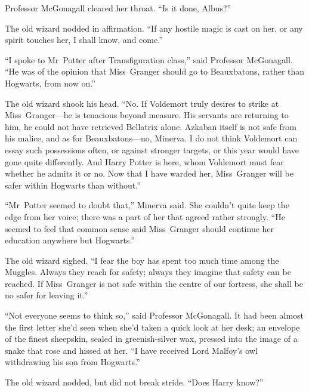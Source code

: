 Professor McGonagall cleared her throat. “Is it done, Albus?”

The old wizard nodded in affirmation. “If any hostile magic is cast on her, or any spirit touches her, I shall know, and come.”

“I spoke to Mr~Potter after Transfiguration class,” said Professor McGonagall. “He was of the opinion that Miss~Granger should go to Beauxbatons, rather than Hogwarts, from now on.”

The old wizard shook his head. “No. If Voldemort truly desires to strike at Miss~Granger—he is tenacious beyond measure. His servants are returning to him, he could not have retrieved Bellatrix alone. Azkaban itself is not safe from his malice, and as for Beauxbatons—no, Minerva. I do not think Voldemort can essay such possessions often, or against stronger targets, or this year would have gone quite differently. And Harry Potter is here, whom Voldemort must fear whether he admits it or no. Now that I have warded her, Miss~Granger will be safer within Hogwarts than without.”

“Mr~Potter seemed to doubt that,” Minerva said. She couldn’t quite keep the edge from her voice; there was a part of her that agreed rather strongly. “He seemed to feel that common sense said Miss~Granger should continue her education anywhere but Hogwarts.”

The old wizard sighed. “I fear the boy has spent too much time among the Muggles. Always they reach for safety; always they imagine that safety can be reached. If Miss~Granger is not safe within the centre of our fortress, she shall be no safer for leaving it.”

“Not everyone seems to think so,” said Professor McGonagall. It had been almost the first letter she’d seen when she’d taken a quick look at her desk; an envelope of the finest sheepskin, sealed in greenish-silver wax, pressed into the image of a snake that rose and hissed at her. “I have received Lord Malfoy’s owl withdrawing his son from Hogwarts.”

The old wizard nodded, but did not break stride. “Does Harry know?”

